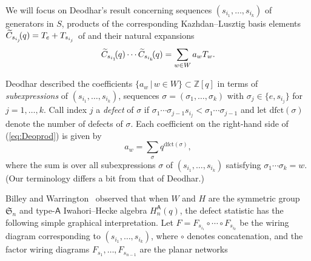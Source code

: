 \documentclass[12pt]{amsart}
\theoremstyle{definition}
\numberwithin{equation}{section}
\newcommand{\sn}{\mathfrak{S}_n}
\newcommand{\hanq}{H_n^{\msfA}(q)}
\newcommand{\wtc}[2]{\widetilde{C}_{#1}(#2)}
\newcommand{\dfct}{\mathrm{dfct}}
\newcommand{\ntksp}{\negthickspace}
\newcommand{\msfA}{\mathsf{A}}
\begin{document}
We will focus on Deodhar's result \cite[Prop.\,3.5]{Deodhar90}
concerning sequences $(s_{i_1},\dotsc,s_{i_k})$ of generators in $S$, products of the 
corresponding Kazhdan--Lusztig basis elements $\wtc{s_{i_j}\ntksp}q = T_e + T_{s_{i_j}}$ of and their natural expansions \begin{equation}\label{eq:Deoprod}
\wtc{s_{i_1}\ntksp}q \cdots \wtc{s_{i_k}\ntksp}q= \sum_{w \in W} a_w T_w.
\end{equation}

Deodhar described the coefficients $\{ a_w \,|\, w \in W \} \subset \mathbb Z[q]$ 
in terms of {\em subexpressions} of $(s_{i_1}, \dotsc, s_{i_k})$, sequences $\sigma = (\sigma_1, \dotsc, \sigma_k)$ with $\sigma_j \in \{ e, s_{i_j}\}$ for $j = 1,\dotsc, k$. Call index $j$ a {\em defect} of $\sigma$ if 
$\sigma_1 \cdots \sigma_{j-1}s_{i_j} < \sigma_1 \cdots \sigma_{j-1}$ and let $\dfct(\sigma)$ denote the number of defects of $\sigma$. Each coefficient on the right-hand side of (\ref{eq:Deoprod}) is given by
\begin{equation}\label{eq:Deodefectformula}
    a_w = \sum_\sigma q^{\dfct(\sigma)},
\end{equation}
where the sum is over all subexpressions
$\sigma$ of $(s_{i_1},\dotsc, s_{i_k})$
satisfying $\sigma_1 \cdots \sigma_k = w$. (Our terminology differs a bit from that of Deodhar.)

Billey and Warrington~\cite[Rmk.\,6]{BWHex}
observed that when $W$ and $H$ are
the symmetric group $\sn$ and type-$\msfA$ Iwahori--Hecke algebra
$\hanq$, the defect statistic has the following simple graphical interpretation.
Let $F = F_{s_{i_1}} \circ \cdots \circ F_{s_{i_k}}$ be the wiring diagram corresponding to $(s_{i_1}, \dotsc, s_{i_k})$, where $\circ$ denotes concatenation, and the factor wiring diagrams 
$F_{s_1}, \dotsc, F_{s_{n-1}}$
are the planar networks
\end{document}
